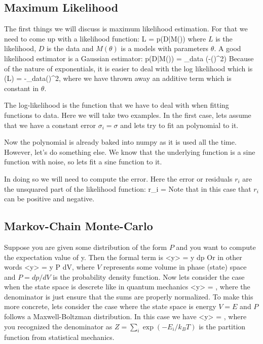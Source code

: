 \subsection{Maximum Likelihood}

The first things we will discuss is maximum likelihood estimation.  For that we need to come up with a likelihood function:
\be
L = p(D|M(\theta))
\ee
where $L$ is the likelihood, $D$ is the data and $M(\theta)$ is a models with parameters $\theta$.  A good likelihood estimator is a Gaussian estimator:
\be
p(D|M(\theta)) = \prod_{\rm data} \exp\left(-\left(\right)^2\right)
\ee
Because of the nature of exponentials, it is easier to deal with the log likelihood which is 
\be
\log(L) = -\sum_{\rm data}\left(\right)^2,
\ee
where we have thrown away an additive term which is constant in $\theta$.  

The log-likelihood is the function that we have to deal with when fitting functions to data.  Here we will take two examples.  In the first case, lets assume that we have a constant error $\sigma_i=\sigma$ and lets try to fit an polynomial to it. 

Now the polynomial is already baked into numpy as it is used all the time.  However, let's do something else.  We know that the underlying function is a sine function with noise, so lets fit a sine function to it. 

In doing so we will need to compute the error.  Here the error or residuals $r_i$ are the unsquared part of the likelihood function:
\be
r_i = 
\ee
Note that in this case that $r_i$ can be positive and negative.  

\subsection{Markov-Chain Monte-Carlo}

Suppose you are given some distribution of the form $P$ and you want to compute the expectation value of y.  Then the formal term is 
\be
\left<y\right> = \int y dp
\ee
Or in other words 
\be
\left<y\right> = \int y P dV,
\ee
where $V$ represents some volume in phase (state) space and $P= dp/dV$ is the probability density function.  Now lets consider the case when the state space is descrete like in quantum mechanics 
\be
\left<y\right> = ,
\ee
where the denominator is just ensure that the sums are properly normalized.  To make this more concrete, lets consider the case where the state space is energy $V=E$ and $P$ follows a Maxwell-Boltzman distribution.  In this case we have
\be
\left<y\right> = ,
\ee
where you recognized the denominator as $Z = \sum_i \exp(-E_i/k_BT)$ is the partition function from statistical mechanics.  

